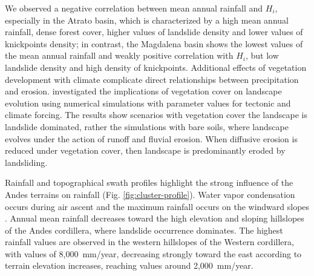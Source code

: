 \documentclass[draft]{agujournal2019}
\begin{document}
\par We observed a negative correlation between mean annual rainfall and $H_i$, especially in the Atrato basin, which is characterized by a high mean annual rainfall, dense forest cover, higher values of landslide density and lower values of knickpoints density; in contrast, the Magdalena basin shows the lowest values of the mean annual rainfall and weakly positive correlation with $H_i$, but low landslide density and high density of knickpoints. Additional effects of vegetation development with climate complicate direct relationships between precipitation and erosion.  investigated the implications of vegetation cover on landscape evolution using numerical simulations with parameter values for tectonic and climate forcing. The results show scenarios with vegetation cover the landscape is landslide dominated, rather the simulations with bare soils, where landscape evolves under the action of runoff and fluvial erosion. When diffusive erosion is reduced under vegetation cover, then landscape is predominantly eroded by landsliding.
 
 \par Rainfall and topographical swath profiles highlight the strong influence of the Andes terrains on rainfall (Fig. \ref{fig:cluster-profile}). Water vapor condensation occurs during air ascent and the maximum rainfall occurs on the windward slopes . Annual mean rainfall decreases toward the high elevation and sloping hillslopes of the Andes cordillera, where landslide occurrence dominates. The highest rainfall values are observed in the western hillslopes of the Western cordillera, with values of 8,000~mm/year, decreasing strongly toward the east according to terrain elevation increases, reaching values around 2,000~mm/year.
 
\end{document}
